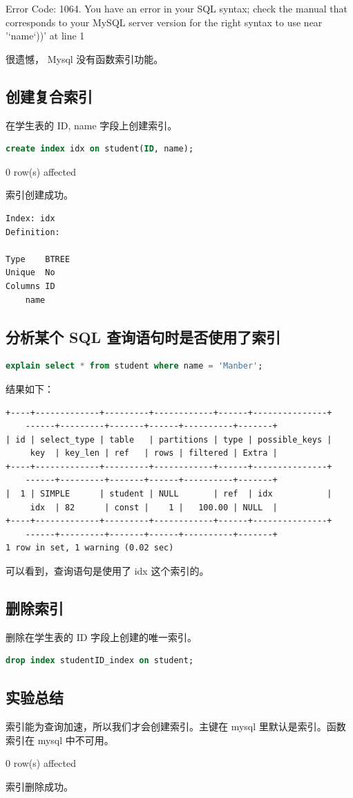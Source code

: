 \documentclass{article}
\begin{document}
Error Code: 1064. You have an error in your SQL syntax; check the manual that corresponds to your MySQL server version for the right syntax to use near '`name`))' at line 1

很遗憾， Mysql 没有函数索引功能。

\subsection{创建复合索引}

在学生表的 ID, name 字段上创建索引。

\begin{lstlisting}[language=sql]
create index idx on student(ID, name);
\end{lstlisting}

0 row(s) affected

索引创建成功。

\begin{lstlisting}
Index: idx
Definition:

Type	BTREE
Unique	No
Columns	ID
	name
\end{lstlisting}

\subsection{分析某个 SQL 查询语句时是否使用了索引}

\begin{lstlisting}[language=sql]
explain select * from student where name = 'Manber';
\end{lstlisting}

结果如下：

\begin{lstlisting}
+----+-------------+---------+------------+------+---------------+
	------+---------+-------+------+----------+-------+
| id | select_type | table   | partitions | type | possible_keys |
	 key  | key_len | ref   | rows | filtered | Extra |
+----+-------------+---------+------------+------+---------------+
	------+---------+-------+------+----------+-------+
|  1 | SIMPLE      | student | NULL       | ref  | idx           |
	 idx  | 82      | const |    1 |   100.00 | NULL  |
+----+-------------+---------+------------+------+---------------+
	------+---------+-------+------+----------+-------+
1 row in set, 1 warning (0.02 sec)

\end{lstlisting}

可以看到，查询语句是使用了 idx 这个索引的。

\subsection{删除索引}

删除在学生表的 ID 字段上创建的唯一索引。

\begin{lstlisting}[language=sql]
drop index studentID_index on student;
\end{lstlisting}

\subsection{实验总结}

索引能为查询加速，所以我们才会创建索引。主键在 mysql 里默认是索引。函数索引在 mysql 中不可用。

0 row(s) affected

索引删除成功。
\end{document}
